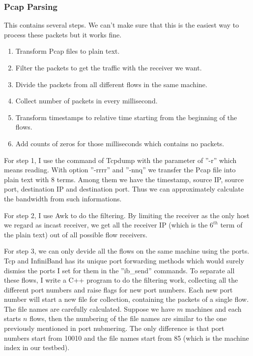 \documentclass{article}
\begin{document}
\subsubsection{Pcap Parsing}
This contains several steps. We can't make sure that this is the easiest way to process these packets but it works fine.
\begin{enumerate}
	\item Transform Pcap files to plain text.
	\item Filter the packets to get the traffic with the receiver we want.
	\item Divide the packets from all different flows in the same machine.
	\item Collect number of packets in every millisecond.
	\item Transform timestamps to relative time starting from the beginning of the flows.
	\item Add counts of zeros for those milliseconds which contains no packets.
\end{enumerate}

For step 1, I use the command of Tcpdump with the parameter of ''-r'' which means reading.
With option ''-rrrr'' and ''-nnq'' we transfer the Pcap file into plain text with 8 terms.
Among them we have the timestamp, source IP, source port, destination IP and destination port.
Thus we can approximately calculate the bandwidth from such informations.

For step 2, I use Awk to do the filtering. By limiting the receiver as the only host we regard as incast receiver, we get all the receiver IP (which is the
$6^{th}$ term of the plain text) out of all possible flow receivers.

For step 3, we can only devide all the flows on the same machine using the ports.
Tcp and InfiniBand has its unique port forwarding methods which would surely dismiss the ports I set for them in the ''ib\_send'' commands.
To separate all these flows, I write a C++ program to do the filtering work, collecting all the different port numbers and raise flags for new port numbers.
Each new port number will start a new file for collection, containing the packets of a single flow.
The file names are carefully calculated.
Suppose we have $m$ machines and each starts $n$ flows, then the numbering of the file names are similar to the one previously mentioned in port nubmering.
The only difference is that port numbers start from 10010 and the file names start from 85 (which is the machine index in our testbed).
\end{document}

